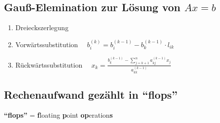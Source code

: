 \documentclass[ngerman,fontsize=11pt, paper=a4, parskip=half, titlepage=true, toc=bib]{scrbook}
\begin{document}
\subsection{Gauß-Elemination zur Lösung von $Ax=b$}
\begin{framed}
	\begin{enumerate}[1]
		\item Dreieckszerlegung
		\item Vorwärtssubstitution        $\quad b_i^{(k)} = b_i^{(k-1)} -b_k^{(k-1)} \cdot   l_{ik} $
		\item Rückwärtssubstitution      $\quad x_k = \frac{b_k^{(k-1)}-\sum_{j=k+1}^{n}a_{kj}^{(k-1)}x_j}{a_{kk}^{(k-1)}}$
	\end{enumerate}
\end{framed}

\subsection{Rechenaufwand gezählt in \enquote{flops}} 
\textbf{\enquote{flops} }= \textbf{f}loating \textbf{p}oint \textbf{op}eration\textbf{s} \\
\end{document}
